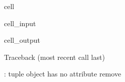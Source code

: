 \documentclass[letterpaper,10pt,english]{jupyterBook}
\begin{document}
\begin{sphinxuseclass}{cell}\begin{sphinxVerbatimInput}

\begin{sphinxuseclass}{cell_input}
\begin{sphinxVerbatim}[commandchars=\\\{\}]
\end{sphinxVerbatim}

\end{sphinxuseclass}\end{sphinxVerbatimInput}
\begin{sphinxVerbatimOutput}

\begin{sphinxuseclass}{cell_output}
\begin{sphinxVerbatim}[commandchars=\\\{\}]
Traceback (most recent call last)
 \PYG{p}{[}\PYG{p}{]}  
 

: \PYGZsq{}tuple\PYGZsq{} object has no attribute \PYGZsq{}remove\PYGZsq{}
\end{sphinxVerbatim}

\end{sphinxuseclass}\end{sphinxVerbatimOutput}

\end{sphinxuseclass}
\end{document}
